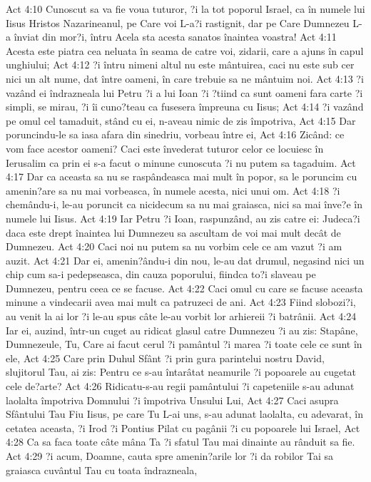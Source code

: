 Act 4:10  Cunoscut sa va fie voua tuturor, ?i la tot poporul Israel, ca în numele lui Iisus Hristos Nazarineanul, pe Care voi L-a?i rastignit, dar pe Care Dumnezeu L-a înviat din mor?i, întru Acela sta acesta sanatos înaintea voastra!
Act 4:11  Acesta este piatra cea neluata în seama de catre voi, zidarii, care a ajuns în capul unghiului;
Act 4:12  ?i întru nimeni altul nu este mântuirea, caci nu este sub cer nici un alt nume, dat între oameni, în care trebuie sa ne mântuim noi.
Act 4:13  ?i vazând ei îndrazneala lui Petru ?i a lui Ioan ?i ?tiind ca sunt oameni fara carte ?i simpli, se mirau, ?i îi cuno?teau ca fusesera împreuna cu Iisus;
Act 4:14  ?i vazând pe omul cel tamaduit, stând cu ei, n-aveau nimic de zis împotriva,
Act 4:15  Dar poruncindu-le sa iasa afara din sinedriu, vorbeau între ei,
Act 4:16  Zicând: ce vom face acestor oameni? Caci este învederat tuturor celor ce locuiesc în Ierusalim ca prin ei s-a facut o minune cunoscuta ?i nu putem sa tagaduim.
Act 4:17  Dar ca aceasta sa nu se raspândeasca mai mult în popor, sa le poruncim cu amenin?are sa nu mai vorbeasca, în numele acesta, nici unui om.
Act 4:18  ?i chemându-i, le-au poruncit ca nicidecum sa nu mai graiasca, nici sa mai înve?e în numele lui Iisus.
Act 4:19  Iar Petru ?i Ioan, raspunzând, au zis catre ei: Judeca?i daca este drept înaintea lui Dumnezeu sa ascultam de voi mai mult decât de Dumnezeu.
Act 4:20  Caci noi nu putem sa nu vorbim cele ce am vazut ?i am auzit.
Act 4:21  Dar ei, amenin?ându-i din nou, le-au dat drumul, negasind nici un chip cum sa-i pedepseasca, din cauza poporului, fiindca to?i slaveau pe Dumnezeu, pentru ceea ce se facuse.
Act 4:22  Caci omul cu care se facuse aceasta minune a vindecarii avea mai mult ca patruzeci de ani.
Act 4:23  Fiind slobozi?i, au venit la ai lor ?i le-au spus câte le-au vorbit lor arhiereii ?i batrânii.
Act 4:24  Iar ei, auzind, într-un cuget au ridicat glasul catre Dumnezeu ?i au zis: Stapâne, Dumnezeule, Tu, Care ai facut cerul ?i pamântul ?i marea ?i toate cele ce sunt în ele,
Act 4:25  Care prin Duhul Sfânt ?i prin gura parintelui nostru David, slujitorul Tau, ai zis: Pentru ce s-au întarâtat neamurile ?i popoarele au cugetat cele de?arte?
Act 4:26  Ridicatu-s-au regii pamântului ?i capeteniile s-au adunat laolalta împotriva Domnului ?i împotriva Unsului Lui,
Act 4:27  Caci asupra Sfântului Tau Fiu Iisus, pe care Tu L-ai uns, s-au adunat laolalta, cu adevarat, în cetatea aceasta, ?i Irod ?i Pontius Pilat cu pagânii ?i cu popoarele lui Israel,
Act 4:28  Ca sa faca toate câte mâna Ta ?i sfatul Tau mai dinainte au rânduit sa fie.
Act 4:29  ?i acum, Doamne, cauta spre amenin?arile lor ?i da robilor Tai sa graiasca cuvântul Tau cu toata îndrazneala,
